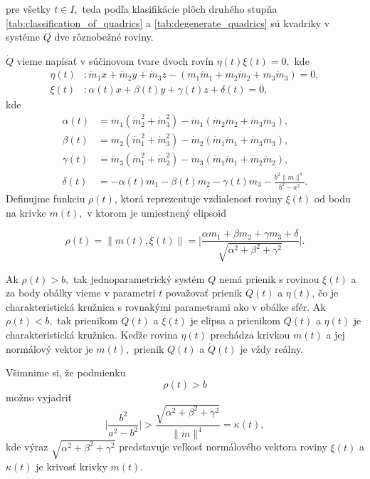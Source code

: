 pre všetky $t \in I,$
teda podľa klasifikácie plôch druhého stupňa \ref{tab:classification_of_quadrics} a \ref{tab:degenerate_quadrics} sú kvadriky v systéme $\dot{Q}$ dve rôznobežné roviny.

$\dot{Q}$ vieme napísať v súčinovom tvare dvoch rovín $ \eta (t) \xi (t) = 0,$
kde 
\begin{align*}
\eta(t) & \colon \dot{m}_1 x + \dot{m}_2 y + \dot{m}_3 z - (m_1 \dot{m}_1 + m_2 \dot{m}_2 + m_3 \dot{m}_3) = 0, \\
\xi(t) & \colon  \alpha (t) x + \beta (t) y + \gamma (t) z + \delta (t) = 0, 
\end{align*}
kde 
\begin{align*}
\alpha (t) &= \ddot{m}_1 (\dot{m}_2^2 + \dot{m}_3^2) - \dot{m}_1(\dot{m}_2 \ddot{m}_2 + \dot{m}_3 \ddot{m}_3) , \\
\beta (t) &= \ddot{m}_2 (\dot{m}_1^2 + \dot{m}_3^2) - \dot{m}_2(\dot{m}_1 \ddot{m}_1 + \dot{m}_3 \ddot{m}_3), \\
\gamma (t) &= \ddot{m}_3 (\dot{m}_1^2 + \dot{m}_2^2) - \dot{m}_3(\dot{m}_1 \ddot{m}_1 + \dot{m}_2 \ddot{m}_2), \\
\delta (t) &= - \alpha (t) m_1 - \beta (t) m_2 - \gamma (t) m_3 - \frac{b^2 \| \dot{m} \|^4 }{b^2 - a^2}.
\end{align*}
Definujme funkciu $\rho(t)$, ktorá reprezentuje vzdialenosť roviny $\xi(t)$ od bodu na krivke $m(t),$ v ktorom je umiestnený elipsoid

$$
\rho (t) = \| m(t), \xi(t) \|= \bigg|  \frac{\alpha m_1 + \beta m_2 + \gamma m_3 + \delta}{\sqrt{\alpha^2 + \beta^2 + \gamma^2}} \bigg|.
$$

Ak $\rho(t) > b,$ tak jednoparametrický systém $Q$ nemá prienik s rovinou $\xi(t) $ a za body obálky vieme v parametri $t$ považovať prienik $Q(t)$ a $\eta(t)$, čo je charakteristická kružnica s rovnakými parametrami ako v obálke sfér. Ak $\rho(t) < b,$ tak prienikom $Q(t)$ a $\xi(t)$ je elipsa a prienikom $Q(t)$ a $\eta(t)$ je charakteristická kružnica. Keďže rovina $\eta(t)$ prechádza krivkou $m(t)$ a jej normálový vektor je $\dot{m}(t),$ prienik $Q(t)$ a $\dot{Q}(t)$ je vždy reálny.

Všimnime si, že podmienku
$$
\rho (t) > b 
$$
možno vyjadriť
$$
\bigg| \frac{b^2}{a^2 - b^2} \bigg| > \frac{\sqrt{\alpha^2 + \beta^2 + \gamma^2}}{\| \dot{m} \|^4} = \kappa (t),
$$
kde výraz $ \sqrt{\alpha^2 + \beta^2 + \gamma^2} $ predstavuje veľkosť normálového vektora roviny $\xi(t)$ a $\kappa(t)$ je krivosť krivky $m(t).$

